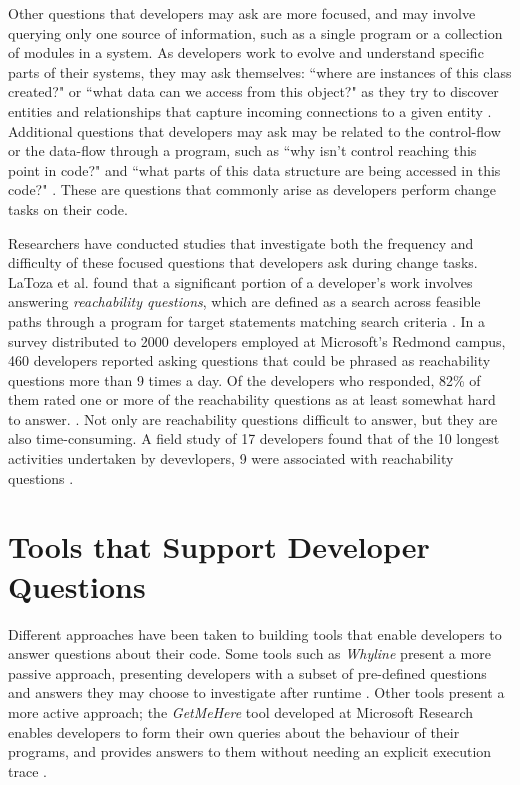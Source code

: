 \par Other questions that developers may ask are more focused, and may involve
querying only one source of information, such as a single program or a
collection of modules in a system.
As developers work to evolve and understand specific parts of their systems,
they may ask themselves: ``where are instances of this class created?" or
``what data can we access from this object?" as they try to discover entities
and relationships that capture incoming connections to a given entity
\cite{sillito-2006-questions-during-task}.
Additional questions that developers may ask may be related to 
the control-flow or the data-flow through a program, such as 
``why isn't control reaching this point in code?" and 
``what parts of this data structure are being accessed in this code?" 
\cite{sillito-2006-questions-during-task}.
These are questions that commonly arise as developers perform change tasks
on their code.

\par Researchers have conducted studies that investigate both the 
frequency and difficulty of these focused questions that developers ask during 
change tasks.
LaToza et al. found that a significant portion of a developer's work involves 
answering \emph{reachability questions}, which are defined as a search across 
feasible paths through a program for target statements matching search criteria 
\cite{latoza-2010-reach}.
In a survey distributed to 2000 developers employed at Microsoft's Redmond
campus, 460 developers reported asking questions that could be phrased as 
reachability questions more than 9 times a day.
Of the developers who responded, 82\% of them rated one or more of the
reachability questions as at least somewhat hard to answer.
\cite{latoza-2010-reach}.
Not only are reachability questions difficult to answer, but they are also
time-consuming.
A field study of 17 developers found that of the 10 longest activities
undertaken by devevlopers, 9 were associated with reachability questions
\cite{latoza-2010-reach}.


\section{Tools that Support Developer Questions}
\label{sec:ToolsSupportDeveloperQuestions}

\noindent Different approaches have been taken to building tools 
that enable developers to answer questions about their code.
Some tools such as \emph{Whyline} present a more passive approach,
presenting developers with a subset of pre-defined questions and answers 
they may choose to investigate after runtime \cite{ko-2004-whyline}.
Other tools present a more active approach; the \emph{GetMeHere} tool developed
at Microsoft Research enables developers to form their own queries about
the behaviour of their programs, and provides answers to them without needing
an explicit execution trace \cite{barnett-2014-get}.


